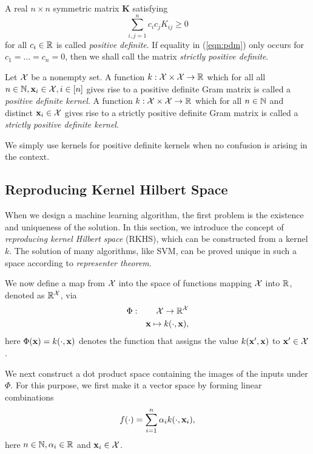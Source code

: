 \begin{definition}\label{def:psd}
A real $n\times n$ symmetric matrix $\mathbf K$ satisfying
\begin{equation}
\sum_{i,j=1}^n c_ic_jK_{ij}\geq 0 \label{eqn:pdm}
\end{equation}
for all $c_i\in{\mathbb R}$ is called {\em positive definite}. If equality in (\ref{eqn:pdm}) only occurs for $c_1=\ldots=c_n=0$, then we shall call the matrix {\em strictly positive definite}.
\end{definition}

\begin{definition}
Let ${\cal X}$ be a nonempty set. A function $k:{\cal X}\times{\cal X}\rightarrow{\mathbb R}$ which for all all $n\in{\mathbb N},\mathbf{x}_i\in{\cal X},i\in[n]$ gives rise to a positive definite Gram matrix is called a {\em positive definite kernel}. A function $k:{\cal X}\times{\cal X}\rightarrow{\mathbb R}$ which for all $n\in{\mathbb N}$ and distinct $\mathbf{x}_i\in{\cal X}$ gives rise to a strictly positive definite Gram matrix is called a {\em strictly positive definite kernel}.
\end{definition}

We simply use kernels for positive definite kernels when no confusion is arising in the context.

\subsection{Reproducing Kernel Hilbert Space}

When we design a machine learning algorithm, the first problem is the existence and uniqueness of the solution. In this section, we introduce the concept of {\em reproducing kernel Hilbert space} (RKHS), which can be constructed from a kernel $k$. The solution of many algorithms, like SVM, can be proved unique in such a space according to {\em representer theorem}\cite{colt/ScholkopfHS01}.

We now define a map from ${\cal X}$ into the space of functions mapping ${\cal X}$ into ${\mathbb R}$, denoted as ${\mathbb R}^{\cal X}$, via
\begin{eqnarray}
&\Phi:&{\cal X}\rightarrow{\mathbb R}^{\cal X}\nonumber\\
&&\mathbf{x}\mapsto k(\cdot,\mathbf{x}),\nonumber
\end{eqnarray}
here $\Phi(\mathbf{x})=k(\cdot,\mathbf{x})$ denotes the function that assigns the value $k(\mathbf{x}',\mathbf{x})$ to $\mathbf{x}'\in{\cal X}$.

We next construct a dot product space containing the images of the inputs under $\Phi$. For this purpose, we first make it a vector space by forming linear combinations
\begin{equation}
f(\cdot)=\sum_{i=1}^n\a_i k(\cdot,\x_i),\label{eqn:f-in-rkhs}
\end{equation}
here $n\in{\mathbb N},{\alpha}_i\in{\mathbb R}$ and $\mathbf{x}_i\in{\cal X}$.

